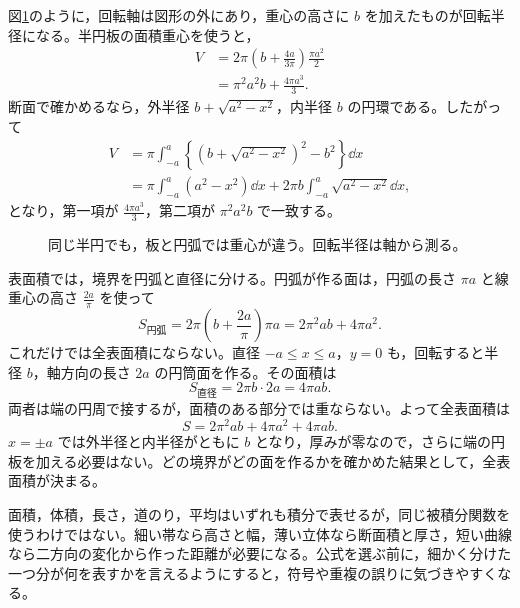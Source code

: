 図\ref{図:半円の二つの重心}のように，回転軸は図形の外にあり，重心の高さに $b$ を加えたものが回転半径になる。半円板の面積重心を使うと，
\[
\begin{aligned}
V&=2\pi\left(b+\frac{4a}{3\pi}\right)\frac{\pi a^2}{2}\\
 &=\pi^2a^2b+\frac{4\pi a^3}{3}.
\end{aligned}
\]
断面で確かめるなら，外半径 $b+\sqrt{a^2-x^2}$，内半径 $b$ の円環である。したがって
\[
\begin{aligned}
V&=\pi\int_{-a}^a
\left\{\left(b+\sqrt{a^2-x^2}\right)^2-b^2\right\}\dd x\\
 &=\pi\int_{-a}^a(a^2-x^2)\dd x
  +2\pi b\int_{-a}^a\sqrt{a^2-x^2}\dd x,
\end{aligned}
\]
となり，第一項が $\frac{4\pi a^3}{3}$，第二項が $\pi^2a^2b$ で一致する。

\begin{figure}[htbp]
\centering
{}
\caption{同じ半円でも，板と円弧では重心が違う。回転半径は軸から測る。}\label{図:半円の二つの重心}
\end{figure}

表面積では，境界を円弧と直径に分ける。円弧が作る面は，円弧の長さ $\pi a$ と線重心の高さ $\frac{2a}{\pi}$ を使って
\[
S_{\mathrm{円弧}}
 =2\pi\left(b+\frac{2a}{\pi}\right)\pi a
 =2\pi^2ab+4\pi a^2.
\]
これだけでは全表面積にならない。直径 $-a\leq x\leq a$，$y=0$ も，回転すると半径 $b$，軸方向の長さ $2a$ の円筒面を作る。その面積は
\[
S_{\mathrm{直径}}=2\pi b\cdot2a=4\pi ab.
\]
両者は端の円周で接するが，面積のある部分では重ならない。よって全表面積は
\[
S=2\pi^2ab+4\pi a^2+4\pi ab.
\]
$x=\pm a$ では外半径と内半径がともに $b$ となり，厚みが零なので，さらに端の円板を加える必要はない。どの境界がどの面を作るかを確かめた結果として，全表面積が決まる。

面積，体積，長さ，道のり，平均はいずれも積分で表せるが，同じ被積分関数を使うわけではない。細い帯なら高さと幅，薄い立体なら断面積と厚さ，短い曲線なら二方向の変化から作った距離が必要になる。公式を選ぶ前に，細かく分けた一つ分が何を表すかを言えるようにすると，符号や重複の誤りに気づきやすくなる。

